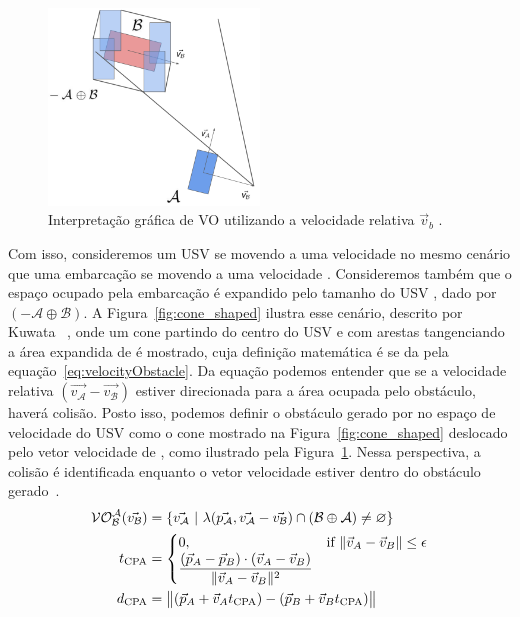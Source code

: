        \begin{figure}
            \centering
            \includegraphics[width=0.5\textwidth]{fig/chap2/vo.png}
            \caption{Interpretação gráfica de VO utilizando a velocidade relativa $\vec{v}_b$ \cite{KUWATA2014110}.}
            \label{fig:vo}
        \end{figure}
        
        Com isso, consideremos um USV \A se movendo a uma velocidade \va no mesmo cenário que uma embarcação \B se movendo a uma velocidade \vb. Consideremos também que o espaço ocupado pela embarcação \B é expandido pelo tamanho do USV \A, dado por $(-\mathcal{A} \oplus \mathcal{B})$. A Figura~\ref{fig:cone_shaped} ilustra esse cenário, descrito por Kuwata \etal~\cite{KUWATA2014110}, onde um cone partindo do centro do USV \A e com arestas tangenciando a área expandida de \B é mostrado, cuja definição matemática é se da pela equação~\eqref{eq:velocityObstacle}. Da equação podemos entender que se a velocidade relativa $(\vec{v_\mathcal{A}} - \vec{v_\mathcal{B}})$ estiver direcionada para a área ocupada pelo obstáculo, haverá colisão. Posto isso, podemos definir o obstáculo gerado por \B no espaço de velocidade do USV \A como o cone mostrado na Figura~\ref{fig:cone_shaped} deslocado pelo vetor velocidade de \vb, como ilustrado pela Figura~\ref{fig:vo}. Nessa perspectiva, a colisão é identificada enquanto o vetor velocidade \va estiver dentro do obstáculo gerado~\cite{KUWATA2014110}.
        \begin{align}
            \mathcal{VO^A_B}(\vec{v_\mathcal{B}}) &= \{\vec{v_\mathcal{A}}~|~\lambda(\vec{p_\mathcal{A}}, \vec{v_\mathcal{A}} - \vec{v_\mathcal{B}}) \cap (\mathcal{B} \oplus \mathcal{A}) \neq \varnothing\}\label{eq:velocityObstacle}\\
            t_{\rm CPA} &=
            \begin{cases}
                0, & \text{if } \Vert\vec{v}_{A}-\vec{v}_{B}\Vert\leq\epsilon\\
                \displaystyle{{(\vec{p}_{A}-\vec{p}_{B})\cdot(\vec{v}_{A}-\vec{v}_{B})}\over{\Vert\vec{v}_{A}-\vec{v}_{B}\Vert^{2}}}
            \end{cases}\label{eq:tcpa}\\
            d_{\rm CPA} &=\bigl\Vert (\vec{p}_{A}+\vec{v}_{A}t_{\rm CPA})-(\vec{p}_{B}+\vec{v}_{B}t_{\rm CPA})\bigr\Vert\label{eq:dcpa}
        \end{align}
        
